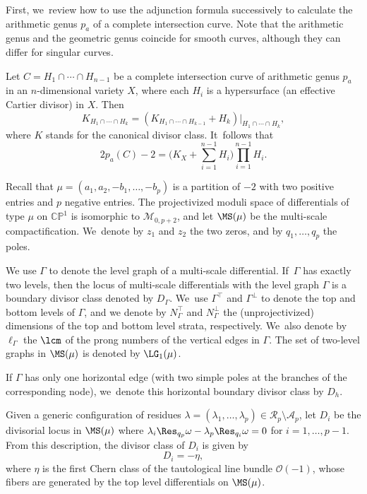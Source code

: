 First, we~review how to use the adjunction formula successively to calculate the arithmetic genus $p_a$ of a complete intersection curve. Note that the arithmetic genus and the geometric genus coincide for smooth curves, although they can differ for singular curves.

Let $C = H_1\cap \cdots \cap H_{n-1}$ be a complete intersection curve of arithmetic genus $p_a$ in an $n$-dimensional variety $X$, where each $H_i$ is a hypersurface (\ie an effective Cartier divisor) in $X$. Then
\[
K_{H_1\cap\cdots \cap H_k} = \left(K_{H_1\cap \cdots \cap H_{k-1}} + H_k\right)|_{H_1\cap \cdots \cap H_{k}},
\]
where $K$ stands for the canonical divisor class. It~follows that\vspace*{-3pt}
\[
2p_a(C)-2 = \biggl(K_X + \sum_{i=1}^{n-1} H_i \biggr) \prod_{i=1}^{n-1} H_i.
\]

Recall that $\mu = (a_1, a_2, -b_1, \ldots, -b_p)$ is a partition of $-2$ with two positive entries and $p$ negative entries. The projectivized moduli space of differentials of type $\mu$ on $\mathbb{CP}^1$ is isomorphic to $\mathcal M_{0,p+2}$, and let $\MS(\mu)$ be the multi-scale compactification. We~denote by $z_1$ and $z_2$ the two zeros, and by $q_1,\ldots,q_p$ the poles.

We use $\Gamma$ to denote the level graph of a multi-scale differential. If~$\Gamma$ has exactly two levels, then the locus of multi-scale differentials with the level graph $\Gamma$ is a boundary divisor class denoted by $D_\Gamma$. We~use $\Gamma^{\top}$ and $\Gamma^{\bot}$ to denote the top and bottom levels of $\Gamma$, and we denote by $N_{\Gamma}^{\top}$ and $N_{\Gamma}^{\bot}$ the (unprojectivized) dimensions of the top and bottom level strata, respectively. We~also denote by $\ell_\Gamma$ the $\lcm$ of the prong numbers of the vertical edges in $\Gamma$. The set of two-level graphs in $\MS(\mu)$ is denoted by $\LG_1(\mu)$.

If $\Gamma$ has only one horizontal edge (\ie with two simple poles at the branches of the corresponding node), we~denote this horizontal boundary divisor class by $D_h$.

Given a generic configuration of residues $\lambda = (\lambda_{1}, \ldots, \lambda_{p})\in \mathcal{R}_{p} \setminus \mathcal{A}_{p}$, let $D_i$ be the divisorial locus in $\MS(\mu)$
where $\lambda_i \Res_{q_p}\omega - \lambda_{p} \Res_{q_i}\omega = 0$ for $i=1,\ldots, p-1$. From this description, the divisor class of $D_i$ is given by\vspace*{-3pt}\enlargethispage{\baselineskip}
\[
D_i = -\eta,
\]
where $\eta$ is the first Chern class of the tautological line bundle $\mathcal O(-1)$, whose fibers are generated by the top level differentials on $\MS(\mu)$.

